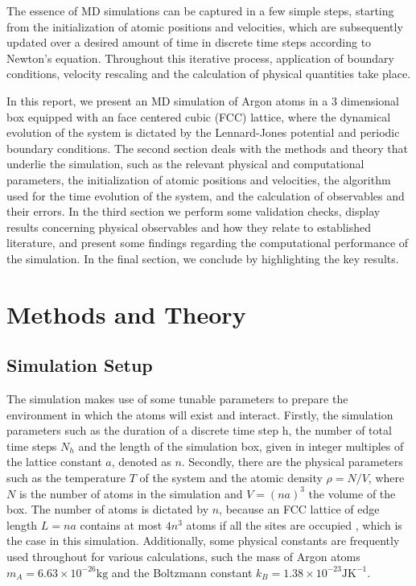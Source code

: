 \documentclass[twocolumn,10pt]{article}
\begin{document}
The essence of MD simulations can be captured in a few simple steps, starting from the initialization of atomic positions and velocities, which are subsequently updated over a desired amount of time in discrete time steps according to Newton's equation. Throughout this iterative process, application of boundary conditions, velocity rescaling and the calculation of physical quantities take place.

In this report, we present an MD simulation of Argon atoms in a 3 dimensional box equipped with an face centered cubic (FCC) lattice, where the dynamical evolution of the system is dictated by the Lennard-Jones potential and periodic boundary conditions. The second section deals with the methods and theory that underlie the simulation, such as the relevant physical and computational parameters, the initialization of atomic positions and velocities, the algorithm used for the time evolution of the system, and the calculation of observables and their errors. In the third section we perform some validation checks, display results concerning physical observables and how they relate to established literature, and present some findings regarding the computational performance of the simulation. In the final section, we conclude by highlighting the key results.

\section{Methods and Theory}

\subsection{Simulation Setup}

The simulation makes use of some tunable parameters to prepare the environment in which the atoms will exist and interact. Firstly, the simulation parameters such as the duration of a discrete time step h, the number of total time steps $N_h$ and the length of the simulation box, given in integer multiples of the lattice constant $a$, denoted as $n$. Secondly, there are the physical parameters such as the temperature $T$ of the system and the atomic density $\rho = N/V$, where $N$ is the number of atoms in the simulation and $V = (na)^3$ the volume of the box. The number of atoms is dictated by $n$, because an FCC lattice of edge length $L = na$ contains at most $4n^3$ atoms if all the sites are occupied \cite{kittel}, which is the case in this simulation.
Additionally, some physical constants are frequently used throughout for various calculations, such the mass of Argon atoms $m_A=6.63\times10^{-26}\text{kg}$ and the Boltzmann constant $k_B=1.38\times10^{-23}\text{JK}^{-1}$.\\
\end{document}
